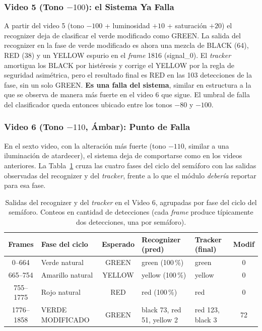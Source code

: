 \subsubsection{Video 5 (Tono $-100$): el Sistema Ya Falla}

A partir del video 5 (tono $-100$ + luminosidad $+10$ + saturación $+20$) el recognizer deja de clasificar el verde modificado como GREEN. La salida del recognizer en la fase de verde modificado es ahora una mezcla de BLACK (64), RED (38) y un YELLOW espurio en el \textit{frame} 1816 (signal\_0). El \textit{tracker} amortigua los BLACK por histéresis y corrige el YELLOW por la regla de seguridad asimétrica, pero el resultado final es RED en las 103 detecciones de la fase, sin un solo GREEN. \textbf{Es una falla del sistema}, similar en estructura a la que se observa de manera más fuerte en el video 6 que sigue. El umbral de falla del clasificador queda entonces ubicado entre los tonos $-80$ y $-100$.

\subsubsection{Video 6 (Tono $-110$, Ámbar): Punto de Falla}

En el sexto video, con la alteración más fuerte (tono $-110$, similar a una iluminación de atardecer), el sistema deja de comportarse como en los videos anteriores. La Tabla~\ref{tab:fases_video6} cruza las cuatro fases del ciclo del semáforo con las salidas observadas del recognizer y del \textit{tracker}, frente a lo que el módulo \textit{debería} reportar para esa fase.

\begin{table}[H]
\centering
\footnotesize
\begin{tabularx}{\textwidth}{|c|X|c|X|X|c|}
\hline
\textbf{Frames} & \textbf{Fase del ciclo} & \textbf{Esperado} & \textbf{Recognizer (pred)} & \textbf{Tracker (final)} & \textbf{Modif} \\
\hline
0--664 & Verde natural & GREEN & green (100\,\%) & green & 0 \\
\hline
665--754 & Amarillo natural & YELLOW & yellow (100\,\%) & yellow & 0 \\
\hline
755--1775 & Rojo natural & RED & red (100\,\%) & red & 0 \\
\hline
1776--1858 & VERDE MODIFICADO & GREEN & black 73, red 51, yellow 2 & red 123, black 3 & 72 \\
\hline
\end{tabularx}
\caption[Salidas del recognizer y del \textit{tracker} en el Video 6 por fase.]{Salidas del recognizer y del \textit{tracker} en el Video 6, agrupadas por fase del ciclo del semáforo. Conteos en cantidad de detecciones (cada \textit{frame} produce típicamente dos detecciones, una por semáforo).}
\label{tab:fases_video6}
\end{table}

